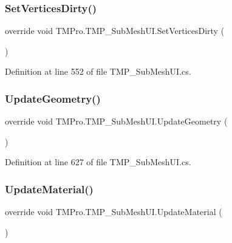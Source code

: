 \subsubsection{\texorpdfstring{SetVerticesDirty()}{SetVerticesDirty()}}
{\footnotesize\ttfamily override void T\+M\+Pro.\+T\+M\+P\+\_\+\+Sub\+Mesh\+U\+I.\+Set\+Vertices\+Dirty (\begin{DoxyParamCaption}{ }\end{DoxyParamCaption})}







Definition at line 552 of file T\+M\+P\+\_\+\+Sub\+Mesh\+U\+I.\+cs.

\mbox{\label{class_t_m_pro_1_1_t_m_p___sub_mesh_u_i_a6b99dad67454e0b386bc261e9d11aceb}} 
\subsubsection{\texorpdfstring{UpdateGeometry()}{UpdateGeometry()}}
{\footnotesize\ttfamily override void T\+M\+Pro.\+T\+M\+P\+\_\+\+Sub\+Mesh\+U\+I.\+Update\+Geometry (\begin{DoxyParamCaption}{ }\end{DoxyParamCaption})\hspace{0.3cm}{\ttfamily [protected]}}







Definition at line 627 of file T\+M\+P\+\_\+\+Sub\+Mesh\+U\+I.\+cs.

\mbox{\label{class_t_m_pro_1_1_t_m_p___sub_mesh_u_i_af58b19bacdca0f7738002d4f2601cacc}} 
\subsubsection{\texorpdfstring{UpdateMaterial()}{UpdateMaterial()}}
{\footnotesize\ttfamily override void T\+M\+Pro.\+T\+M\+P\+\_\+\+Sub\+Mesh\+U\+I.\+Update\+Material (\begin{DoxyParamCaption}{ }\end{DoxyParamCaption})\hspace{0.3cm}{\ttfamily [protected]}}








